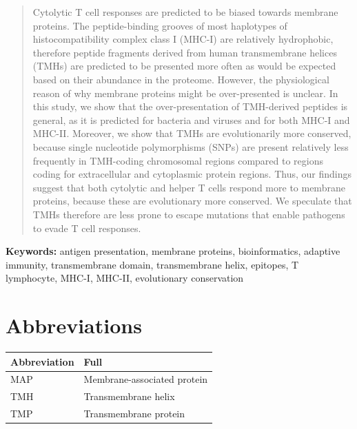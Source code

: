 \begin{abstract}

Cytolytic T cell responses are predicted to be biased towards membrane proteins. 
The peptide-binding grooves of most haplotypes 
of histocompatibility complex class I (MHC-I) are relatively hydrophobic, 
therefore peptide fragments derived from human transmembrane helices (TMHs) are predicted to be presented more often as would be expected 
based on their abundance in the proteome. However, the physiological reason of why membrane proteins might be over-presented is unclear. 
In this study, we show that the over-presentation of TMH-derived peptides is general, as it is predicted for bacteria and viruses 
and for both MHC-I and MHC-II. Moreover, we show that TMHs are evolutionarily more conserved, 
because single nucleotide polymorphisms (SNPs) are present 
relatively less frequently in TMH-coding chromosomal regions 
compared to regions coding for extracellular and cytoplasmic protein regions. 
Thus, our findings suggest that 
both cytolytic and helper T cells respond more to membrane proteins, 
because these are evolutionary more conserved. 
We speculate that TMHs therefore are less prone to escape mutations 
that enable pathogens to evade T cell responses.

\end{abstract}

{\bf Keywords:} antigen presentation, membrane proteins, bioinformatics, 
adaptive immunity, transmembrane domain, transmembrane helix, 
epitopes, T lymphocyte, MHC-I, MHC-II, evolutionary conservation

\section*{Abbreviations}

\begin{table}[h]
  \begin{tabular}{ll}
    Abbreviation & Full               \\ 
    \hline
    MAP & Membrane-associated protein \\
    TMH & Transmembrane helix         \\
    TMP & Transmembrane protein
  \end{tabular}
\end{table}

